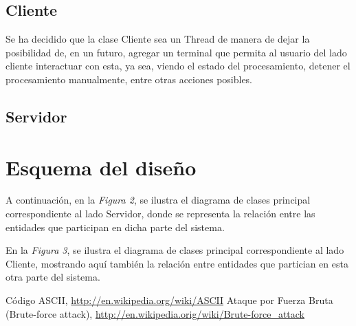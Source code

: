 \documentclass{article}
\begin{document}
\subsection{Cliente}
	
	Se ha decidido que la clase Cliente sea un Thread de manera de dejar la posibilidad de, en un futuro, agregar un terminal que permita al usuario del lado cliente interactuar con esta, ya sea, viendo el estado del procesamiento, detener el procesamiento manualmente, entre otras acciones posibles.
	\bigskip	



\subsection{Servidor}

	\bigskip




\section{Esquema del diseño}

	A continuación, en la \textit{Figura 2}, se ilustra el diagrama de clases principal correspondiente al lado Servidor, donde se representa la relación entre las entidades que participan en dicha parte del sistema. 



	En la \textit{Figura 3}, se ilustra el diagrama de clases principal correspondiente al lado Cliente, mostrando aquí también la relación entre entidades que partician en esta otra parte del sistema.

\bigskip\bigskip




\begin{thebibliography}{99}

	 Código ASCII, \url{http://en.wikipedia.org/wiki/ASCII}
	 Ataque por Fuerza Bruta (Brute-force attack), \url{http://en.wikipedia.orig/wiki/Brute-force_attack}
	\end{thebibliography}

\newpage
\end{document}
